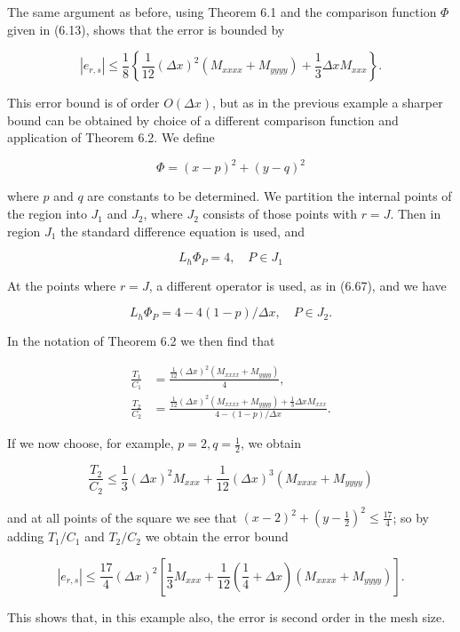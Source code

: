 \documentclass[10pt]{article}
\begin{document}
The same argument as before, using Theorem 6.1 and the comparison function \(\Phi\) given in (6.13), shows that the error is bounded by

\[
\left|e_{r, s}\right| \leq \frac{1}{8}\left\{\frac{1}{12}(\Delta x)^{2}\left(M_{x x x x}+M_{y y y y}\right)+\frac{1}{3} \Delta x M_{x x x}\right\} .
\]

This error bound is of order \(O(\Delta x)\), but as in the previous example a sharper bound can be obtained by choice of a different comparison function and application of Theorem 6.2. We define

\[
\Phi=(x-p)^{2}+(y-q)^{2}
\]

where \(p\) and \(q\) are constants to be determined. We partition the internal points of the region into \(J_{1}\) and \(J_{2}\), where \(J_{2}\) consists of those points with \(r=J\). Then in region \(J_{1}\) the standard difference equation is used, and

\[
L_{h} \Phi_{P}=4, \quad P \in J_{1}
\]

At the points where \(r=J\), a different operator is used, as in (6.67), and we have

\[
L_{h} \Phi_{P}=4-4(1-p) / \Delta x, \quad P \in J_{2} .
\]

In the notation of Theorem 6.2 we then find that

\[
\begin{aligned}
\frac{T_{1}}{C_{1}} & =\frac{\frac{1}{12}(\Delta x)^{2}\left(M_{x x x x}+M_{y y y y}\right)}{4}, \\
\frac{T_{2}}{C_{2}} & =\frac{\frac{1}{12}(\Delta x)^{2}\left(M_{x x x x}+M_{y y y y}\right)+\frac{1}{3} \Delta x M_{x x x}}{4-(1-p) / \Delta x} .
\end{aligned}
\]

If we now choose, for example, \(p=2, q=\frac{1}{2}\), we obtain

\[
\frac{T_{2}}{C_{2}} \leq \frac{1}{3}(\Delta x)^{2} M_{x x x}+\frac{1}{12}(\Delta x)^{3}\left(M_{x x x x}+M_{y y y y}\right)
\]

and at all points of the square we see that \((x-2)^{2}+\left(y-\frac{1}{2}\right)^{2} \leq \frac{17}{4}\); so by adding \(T_{1} / C_{1}\) and \(T_{2} / C_{2}\) we obtain the error bound

\[
\left|e_{r, s}\right| \leq \frac{17}{4}(\Delta x)^{2}\left[\frac{1}{3} M_{x x x}+\frac{1}{12}\left(\frac{1}{4}+\Delta x\right)\left(M_{x x x x}+M_{y y y y}\right)\right] .
\]

This shows that, in this example also, the error is second order in the mesh size.
\end{document}
